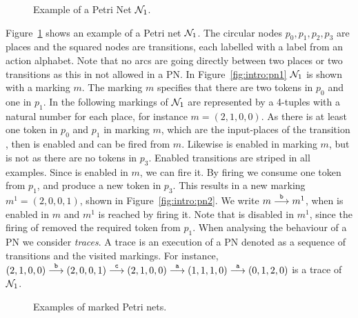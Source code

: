 \begin{figure}[htb]
\centering
    
    \caption{Example of a Petri Net $\mathcal{N}_1$.\label{fig:intro:pn}}
\end{figure}

Figure~\ref{fig:intro:pn} shows an example of a Petri net $\mathcal{N}_1$. The circular nodes $p_0, p_1, p_2, p_3$ are places and the squared nodes are transitions, each labelled with a label from an action alphabet. Note that no arcs are going directly between two places or two transitions as this in not allowed in a PN. In Figure~\ref{fig:intro:pn1} $\mathcal{N}_1$ is shown with a marking $m$. The marking $m$ specifies that there are two tokens in $p_0$ and one in $p_1$. In the following markings of $\mathcal{N}_1$ are represented by a 4-tuples with a natural number for each place, for instance $m = (2,1,0,0)$. As there is at least one token in $p_0$ and $p_1$ in marking $m$, which are the input-places of the transition , then  is enabled and can be fired from $m$. Likewise  is enabled in marking $m$, but  is not as there are no tokens in $p_3$. Enabled transitions are striped in all examples. Since  is enabled in $m$, we can fire it. By firing  we consume one token from $p_1$, and produce a new token in $p_3$. This results in a new marking $m^1 = (2,0,0,1)$, shown in Figure~\ref{fig:intro:pn2}. We write $m \stackrel{\mathtt{b}}{\longrightarrow} m^1$, when  is enabled in $m$ and $m^1$ is reached by firing it. Note that  is disabled in $m^1$, since the firing of  removed the required token from $p_1$. When analysing the behaviour of a PN we consider \emph{traces}. A trace is an execution of a PN denoted as a sequence of transitions and the visited markings. For instance, $(2,1,0,0) \stackrel{\mathtt{b}}{\longrightarrow} (2,0,0,1) \stackrel{\mathtt{c}}{\longrightarrow} (2,1,0,0) \stackrel{\mathtt{a}}{\longrightarrow} (1,1,1,0) \stackrel{\mathtt{a}}{\longrightarrow} (0,1,2,0)$ is a trace of $\mathcal{N}_1$. 

\begin{figure}[ht]         
\centering
    \qquad
    \caption{Examples of marked Petri nets.}
    \label{fig:intro:pn-group}
\end{figure}

